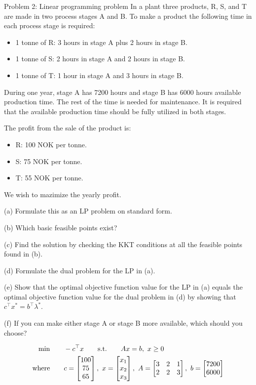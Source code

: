 
\begin{problem}{Problem 2: Linear programming problem}
In a plant three products, R, S, and T are made in two process stages A and B.
To make a product the following time in each process stage is required:
\begin{itemize}
  \item 1 tonne of R: 3 hours in stage A plus 2 hours in stage B.
  \item 1 tonne of S: 2 hours in stage A and 2 hours in stage B.
  \item 1 tonne of T: 1 hour in stage A and 3 hours in stage B.
\end{itemize}
During one year, stage A has 7200 hours and stage B has 6000 hours available production time.
The rest of the time is needed for maintenance. It is required that the available production time should be fully utilized in both stages.

\medskip The profit from the sale of the product is:
\begin{itemize}
  \item R: 100 NOK per tonne.
  \item S: 75 NOK per tonne.
  \item T: 55 NOK per tonne.
\end{itemize}
We wish to mazimize the yearly profit.


\medskip (a) Formulate this as an LP problem on standard form.

\medskip (b) Which basic feasible points exist?

\medskip (c) Find the solution by checking the KKT conditions at all the feasible points found in (b).

\medskip (d) Formulate the dual problem for the LP in (a).

\medskip (e) Show that the optimal objective function value for the LP in (a) equals the optimal objective
function value for the dual problem in (d) by showing that $c^{\top}x^* = b^{\top}\lambda^*$.

\medskip (f) If you can make either stage A or stage B more available, which should you choose?


\end{problem}



\begin{align*}
  \min \qquad         & -c^{\top}x \qquad \text{s.t.} \qquad Ax = b,\ x \geq 0 \\
  \text{where} \qquad & c = \begin{bmatrix} 100                                             \\ 75 \\ 65 \end{bmatrix},\  x = \begin{bmatrix} x_1 \\ x_2 \\ x_3 \end{bmatrix},\  A = \begin{bmatrix} 3 & 2 & 1 \\ 2 & 2 & 3 \end{bmatrix},\ b = \begin{bmatrix} 7200  \\ 6000 \end{bmatrix}
\end{align*}

